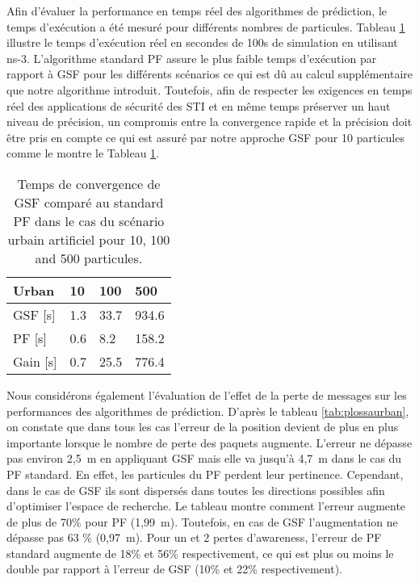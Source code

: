 Afin d'évaluer la performance en temps réel des algorithmes de prédiction, le temps d'exécution a été mesuré pour différents nombres de particules. Tableau \ref{tab:execurban} illustre le temps d'exécution réel en secondes de 100s de simulation en utilisant ns-3. L'algorithme standard PF assure le plus faible temps d'exécution par rapport à GSF pour les différents scénarios ce qui est dû au calcul supplémentaire que notre algorithme introduit. Toutefois, afin de respecter les exigences en temps réel des applications de sécurité des STI et en même temps préserver un haut niveau de précision, un compromis entre la convergence rapide et la précision doit être pris en compte ce qui est assuré par notre approche GSF pour 10 particules comme le montre le Tableau \ref{tab:execurban}.

\begin{table}[h!]
	\centering
	\begin{tabular}{llll}
		\toprule
\textbf{Urban} & \textbf{10} & \textbf{100} & \textbf{500}\\
\midrule 
GSF [s] & 1.3 & 33.7 & 934.6\\
\midrule 
PF [s] & 0.6 & 8.2 & 158.2\\
\midrule
Gain [s] & 0.7 & 25.5 & 776.4\\
		\bottomrule
	\end{tabular}
	\caption{Temps de convergence de GSF comparé au standard PF dans le cas du scénario urbain artificiel pour 10, 100 and 500 particules.}
	\label{tab:execurban}
\end{table}

Nous considérons également l'évaluation de l'effet de la perte de messages sur les performances des algorithmes de prédiction. D'après le tableau \ref{tab:plossaurban}, on constate que dans tous les cas l'erreur de la position devient de plus en plus importante lorsque le nombre de perte des paquets augmente. L'erreur ne dépasse pas environ 2,5~m en appliquant GSF mais elle va jusqu'à 4,7~m dans le cas du PF standard. En effet, les particules du PF perdent leur pertinence. Cependant, dans le cas de GSF ils sont dispersés dans toutes les directions possibles afin d'optimiser l'espace de recherche. Le tableau montre comment l'erreur augmente de plus de 70\% pour PF (1,99~m). Toutefois, en cas de GSF l'augmentation ne dépasse pas 63 \% (0,97~m). Pour un et 2 pertes d'awareness, l'erreur de PF standard augmente de 18\% et 56\% respectivement, ce qui est plus ou moins le double par rapport à l'erreur de GSF (10\% et 22\% respectivement).

